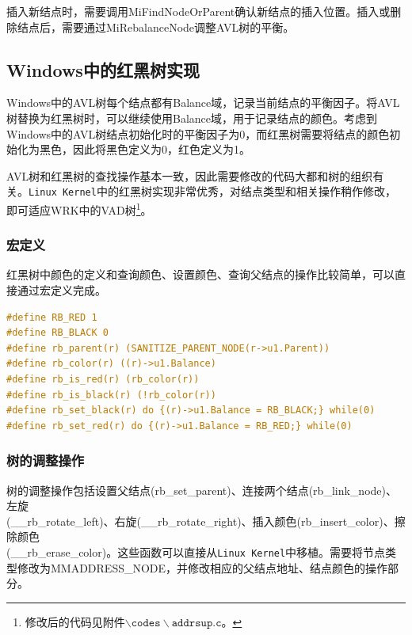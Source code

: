 \documentclass[a4paper, 11pt]{article}
\begin{document}
        插入新结点时，需要调用MiFindNodeOrParent确认新结点的插入位置。插入或删除结点后，需要通过MiRebalanceNode调整AVL树的平衡。
            
        \subsection{Windows中的红黑树实现}
            Windows中的AVL树每个结点都有Balance域，记录当前结点的平衡因子。将AVL树替换为红黑树时，可以继续使用Balance域，用于记录结点的颜色。考虑到Windows中的AVL树结点初始化时的平衡因子为0，而红黑树需要将结点的颜色初始化为黑色，因此将黑色定义为0，红色定义为1。
            
            AVL树和红黑树的查找操作基本一致，因此需要修改的代码大都和树的组织有关。\texttt{Linux Kernel}中的红黑树实现非常优秀，对结点类型和相关操作稍作修改，即可适应WRK中的VAD树\footnote{修改后的代码见附件$\mathtt{\backslash codes\backslash addrsup.c}$。}。
            
            \subsubsection{宏定义}
                红黑树中颜色的定义和查询颜色、设置颜色、查询父结点的操作比较简单，可以直接通过宏定义完成。
\begin{lstlisting}[language={C}]
#define RB_RED 1
#define RB_BLACK 0
#define rb_parent(r) (SANITIZE_PARENT_NODE(r->u1.Parent))
#define rb_color(r) ((r)->u1.Balance)
#define rb_is_red(r) (rb_color(r))
#define rb_is_black(r) (!rb_color(r))
#define rb_set_black(r) do {(r)->u1.Balance = RB_BLACK;} while(0)
#define rb_set_red(r) do {(r)->u1.Balance = RB_RED;} while(0)      
\end{lstlisting}      
            
            \subsubsection{树的调整操作}
                树的调整操作包括设置父结点(rb\_set\_parent)、连接两个结点(rb\_link\_node)、左旋 \\
                (\_\_rb\_rotate\_left)、右旋(\_\_rb\_rotate\_right)、插入颜色(rb\_insert\_color)、擦除颜色 \\
                (\_\_rb\_erase\_color)。这些函数可以直接从\texttt{Linux Kernel}中移植。需要将节点类型修改为MMADDRESS\_NODE，并修改相应的父结点地址、结点颜色的操作部分。
            
\end{document}
